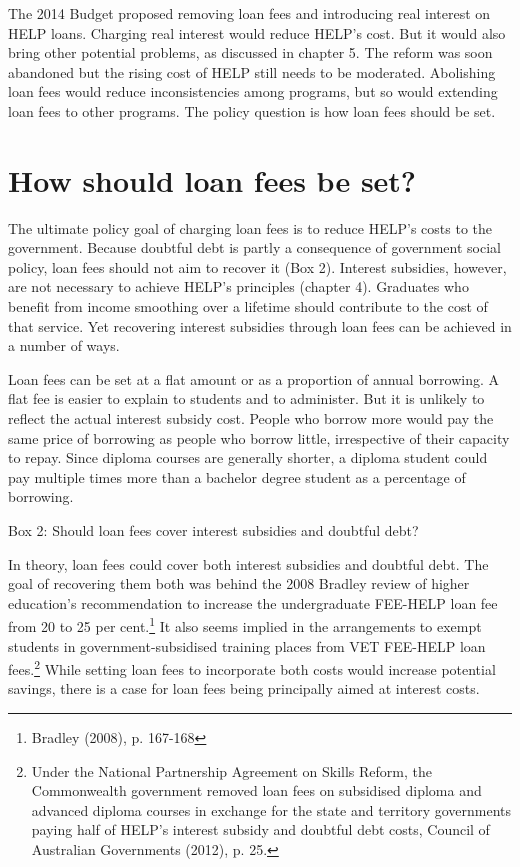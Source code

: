 \documentclass[]{book}
\begin{document}
The 2014 Budget proposed removing loan fees and introducing real interest on HELP loans. Charging real interest would reduce HELP's cost. But it would also bring other potential problems, as discussed in chapter 5. The reform was soon abandoned but the rising cost of HELP still needs to be moderated. Abolishing loan fees would reduce inconsistencies among programs, but so would extending loan fees to other programs. The policy question is how loan fees should be set.

\section{How should loan fees be set?}\label{how-should-loan-fees-be-set}

The ultimate policy goal of charging loan fees is to reduce HELP's costs to the government. Because doubtful debt is partly a consequence of government social policy, loan fees should not aim to recover it (Box 2). Interest subsidies, however, are not necessary to achieve HELP's principles (chapter 4). Graduates who benefit from income smoothing over a lifetime should contribute to the cost of that service. Yet recovering interest subsidies through loan fees can be achieved in a number of ways.

Loan fees can be set at a flat amount or as a proportion of annual borrowing. A flat fee is easier to explain to students and to administer. But it is unlikely to reflect the actual interest subsidy cost. People who borrow more would pay the same price of borrowing as people who borrow little, irrespective of their capacity to repay. Since diploma courses are generally shorter, a diploma student could pay multiple times more than a bachelor degree student as a percentage of borrowing.

\protect\hypertarget{_Ref334445513}{}{}Box 2: Should loan fees cover interest subsidies and doubtful debt?

In theory, loan fees could cover both interest subsidies and doubtful debt. The goal of recovering them both was behind the 2008 Bradley review of higher education's recommendation to increase the undergraduate FEE-HELP loan fee from 20 to 25 per cent.\footnote{Bradley (2008), p. 167-168} It also seems implied in the arrangements to exempt students in government-subsidised training places from VET FEE-HELP loan fees.\footnote{Under the National Partnership Agreement on Skills Reform, the Commonwealth government removed loan fees on subsidised diploma and advanced diploma courses in exchange for the state and territory governments paying half of HELP's interest subsidy and doubtful debt costs, Council of Australian Governments (2012), p. 25.} While setting loan fees to incorporate both costs would increase potential savings, there is a case for loan fees being principally aimed at interest costs.
\end{document}
